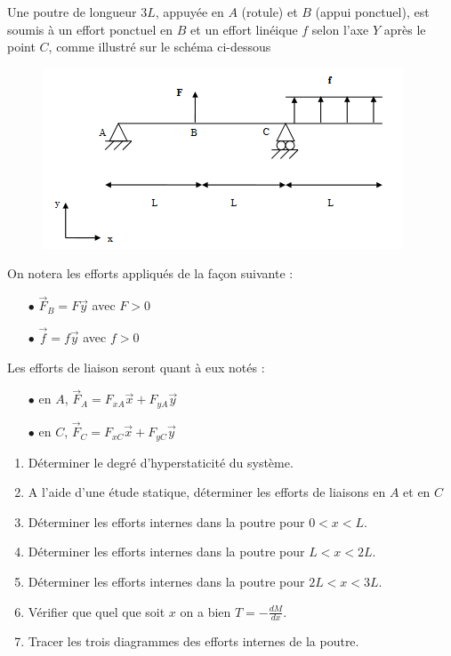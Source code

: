 \documentclass[lecture.tex]{subfiles}
\begin{document}
\exercice{}

Une poutre de longueur $3L$, appuyée en $A$ (rotule) et $B$ (appui ponctuel), est soumis à un effort ponctuel en $B$ et un effort linéique $f$ selon l'axe $Y$ après le point $C$, comme illustré sur le schéma ci-dessous

\begin{figure}[h!]
  \centering
  \includegraphics[scale=0.8]{fig1-rdm-0059.png}
\end{figure}

On notera les efforts appliqués de la façon suivante :
\begin{itemize}
  \item[$\bullet$] $\vec{F}_B = F \vec{y}$ avec  $F>0$
  \item[$\bullet$] $\vec{f} = f \vec{y}$ avec $f>0$
\end{itemize}

Les efforts de liaison seront quant à eux notés :
\begin{itemize}
  \item[$\bullet$] en $A$, $\vec{F}_A = F_{xA} \vec{x} + F_{yA} \vec{y}$
  \item[$\bullet$] en $C$, $\vec{F}_C = F_{xC} \vec{x} + F_{yC} \vec{y}$
\end{itemize}

\bigskip

\begin{enumerate}
  \item Déterminer le degré d'hyperstaticité du système.

  \item A l'aide d'une étude statique, déterminer les efforts de liaisons en $A$ et en $C$

  \item Déterminer les efforts internes dans la poutre pour $0 < x < L$.

  \item Déterminer les efforts internes dans la poutre pour $L < x < 2L$.

  \item Déterminer les efforts internes dans la poutre pour $2L < x < 3L$.

  \item Vérifier que quel que soit $x$ on a bien $\displaystyle T=-\frac{d M}{d x}$.

  \item Tracer les trois diagrammes des efforts internes de la poutre.

\end{enumerate}

\finexercice
\end{document}
